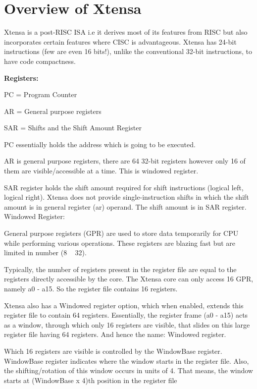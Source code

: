 \pagestyle{plain}
\setlength{\parindent}{2em}
\setlength{\parskip}{1em}

\section{Overview of Xtensa}


   Xtensa is a post-RISC ISA i.e it derives most of its features from RISC but also incorporates 
certain features where CISC is advantageous. Xtensa has 24-bit instructions (few are even 16 bits!),
unlike the conventional 32-bit instructions, to have code compactness.

  \textbf{Registers:}

  PC = Program Counter

  AR = General purpose registers

  SAR = Shifts and the Shift Amount Register

  PC essentially holds the address which is going to be executed.

  AR is general purpose registers, there are 64 32-bit registers however only 16 of them are 
visible/accessible at a time. This is windowed register.

  SAR register holds the shift amount required for shift instructions (logical left, logical right). 
Xtensa does not provide single-instruction shifts in which the shift amount is in general register 
(ar) operand. The shift amount is in SAR register.
  Windowed Register:

  General purpose registers (GPR) are used to store data temporarily for CPU while performing various operations. These registers are blazing fast but are limited in number (8 ~ 32).

  Typically, the number of registers present in the register file are equal to the registers directly accessible by the core. The Xtensa core can only access 16 GPR, namely a0 - a15. So the register file contains 16 registers.

  Xtensa also has a Windowed register option, which when enabled, extends this register file to contain 64 registers. Essentially, the register frame (a0 - a15) acts as a window, through which only 16 registers are visible, that slides on this large register file having 64 registers. And hence the name: Windowed register.

  Which 16 registers are visible is controlled by the WindowBase register. WindowBase register indicates where the window starts in the register file. Also, the shifting/rotation of this window occurs in units of 4. That means, the window starts at (WindowBase x 4)th position in the register file

